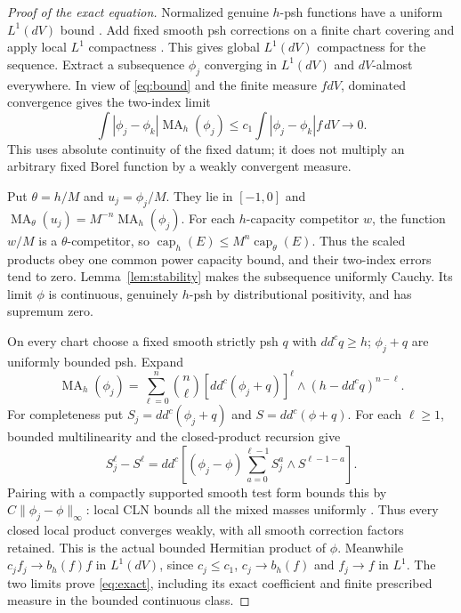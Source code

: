 \documentclass[11pt]{article}
\newcommand{\ddc}{dd^c}
\newcommand{\MA}{\operatorname{MA}}
\newcommand{\capH}{\operatorname{cap}}
\theoremstyle{remark}\newtheorem{remark}[theorem]{Remark}
\begin{document}
\begin{proof}[Proof of the exact equation]
Normalized genuine $h$-psh functions have a uniform $L^1(dV)$ bound
\cite[Proposition 2.1]{DK}. Add fixed smooth psh corrections on a finite
chart covering and apply local $L^1$ compactness
\cite[Chapter I, Propositions 4.21 and 5.9, Theorem 5.8]{Dem}. This gives global
$L^1(dV)$ compactness for the sequence.
Extract a subsequence $\phi_j$ converging in $L^1(dV)$ and $dV$-almost
everywhere. In view of \eqref{eq:bound} and the finite measure $fdV$,
dominated convergence gives the two-index limit
\[
 \int|\phi_j-\phi_k|\MA_h(\phi_j)
   \leq c_1\int|\phi_j-\phi_k|f\,dV\longrightarrow0.
\]
This uses absolute continuity of the fixed datum; it does not multiply
an arbitrary fixed Borel function by a weakly convergent measure.

Put $\theta=h/M$ and $u_j=\phi_j/M$. They lie in $[-1,0]$ and
$\MA_\theta(u_j)=M^{-n}\MA_h(\phi_j)$.
For each $h$-capacity competitor $w$, the function $w/M$ is a
$\theta$-competitor, so
$\capH_h(E)\leq M^n\capH_\theta(E)$.
Thus the scaled products obey one common power capacity bound,
and their two-index errors tend to zero. Lemma~\ref{lem:stability}
makes the subsequence uniformly Cauchy. Its limit $\phi$ is continuous,
genuinely $h$-psh by distributional positivity, and has supremum zero.

On every chart choose a fixed smooth strictly psh $q$ with
$\ddc q\geq h$; $\phi_j+q$ are uniformly bounded psh. Expand
\[
 \MA_h(\phi_j)
 =\sum_{\ell=0}^n\binom n\ell
      [\ddc(\phi_j+q)]^\ell\wedge(h-\ddc q)^{n-\ell}.
\]
For completeness put $S_j=\ddc(\phi_j+q)$ and $S=\ddc(\phi+q)$.
For each $\ell\geq1$, bounded multilinearity and the closed-product
recursion \cite[Section 2, in particular Corollary 2.8]{BT} give
\[
 S_j^\ell-S^\ell=\ddc\left[(\phi_j-\phi)
          \sum_{a=0}^{\ell-1}S_j^a\wedge S^{\ell-1-a}\right].
\]
Pairing with a compactly supported smooth test form bounds this by
$C\|\phi_j-\phi\|_\infty$: local CLN bounds all the mixed masses
uniformly \cite[Theorem 2.10]{BT}. Thus every closed local product
converges weakly, with all smooth correction factors retained.
This is the actual bounded Hermitian product of $\phi$.
Meanwhile $c_jf_j\to b_h(f)f$ in $L^1(dV)$, since $c_j\leq c_1$,
$c_j\to b_h(f)$ and $f_j\to f$ in $L^1$.
The two limits prove \eqref{eq:exact}, including its exact coefficient
and finite prescribed measure in the bounded continuous class.
\end{proof}
\end{document}
